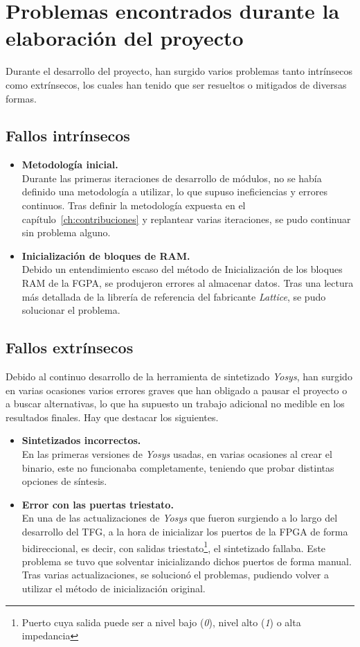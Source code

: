 \section{Problemas encontrados durante la elaboración del proyecto}
Durante el desarrollo del proyecto, han surgido varios problemas tanto intrínsecos como extrínsecos, los cuales han tenido que ser resueltos o mitigados de diversas formas. 

\subsection{Fallos intrínsecos}
\begin{itemize}
    \item \textbf{Metodología inicial.} \\
    Durante las primeras iteraciones de desarrollo de módulos, no se había definido una metodología a utilizar, lo que supuso ineficiencias y errores continuos. Tras definir la metodología expuesta en el capítulo~\ref{ch:contribuciones} y replantear varias iteraciones, se pudo continuar sin problema alguno.
    
    \item \textbf{Inicialización de bloques de RAM.} \\
    Debido un entendimiento escaso del método de Inicialización de los bloques RAM de la FGPA, se produjeron errores al almacenar datos. Tras una lectura más detallada de la librería de referencia\cite{lattice:ice-library} del fabricante \emph{Lattice}, se pudo solucionar el problema.
\end{itemize}

\subsection{Fallos extrínsecos}
Debido al continuo desarrollo de la herramienta de sintetizado \emph{Yosys}, han surgido en varias ocasiones varios errores graves que han obligado a pausar el proyecto o a buscar alternativas, lo que ha supuesto un trabajo adicional no medible en los resultados finales. Hay que destacar los siguientes.
\begin{itemize}
    \item \textbf{Sintetizados incorrectos.} \\
    En las primeras versiones de \emph{Yosys} usadas, en varias ocasiones al crear el binario, este no funcionaba completamente, teniendo que probar distintas opciones de síntesis.

    \item \textbf{Error con las puertas triestato.} \\
    En una de las actualizaciones de \emph{Yosys} que fueron surgiendo a lo largo del desarrollo del TFG, a la hora de inicializar los puertos de la FPGA de forma bidireccional, es decir, con salidas triestato\footnote{Puerto cuya salida puede ser a nivel bajo (\emph{0}), nivel alto (\emph{1}) o alta impedancia}, el sintetizado fallaba. Este problema se tuvo que solventar inicializando dichos puertos de forma manual. Tras varias actualizaciones, se solucionó el problemas, pudiendo volver a utilizar el método de inicialización original.
\end{itemize}


